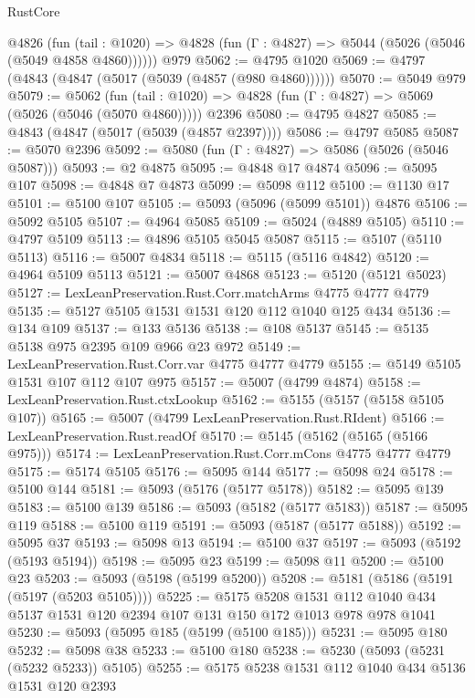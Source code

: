 \begin{lexlean}{RustCore}
\begin{coremodule}
    @4826
      (fun (tail : @1020) => @4828 (fun (Γ : @4827) => @5044 (@5026 (@5046 (@5049 @4858 @4860))))))
    @979
@5062 := @4795 @1020
@5069 := @4797 (@4843 (@4847 (@5017 (@5039 (@4857 (@980 @4860))))))
@5070 := @5049 @979
@5079 := @5062
    (fun (tail : @1020) => @4828 (fun (Γ : @4827) => @5069 (@5026 (@5046 (@5070 @4860)))))
    @2396
@5080 := @4795 @4827
@5085 := @4843 (@4847 (@5017 (@5039 (@4857 @2397))))
@5086 := @4797 @5085
@5087 := @5070 @2396
@5092 := @5080 (fun (Γ : @4827) => @5086 (@5026 (@5046 @5087)))
@5093 := @2 @4875
@5095 := @4848 @17 @4874
@5096 := @5095 @107
@5098 := @4848 @7 @4873
@5099 := @5098 @112
@5100 := @1130 @17
@5101 := @5100 @107
@5105 := @5093 (@5096 (@5099 @5101)) @4876
@5106 := @5092 @5105
@5107 := @4964 @5085
@5109 := @5024 (@4889 @5105)
@5110 := @4797 @5109
@5113 := @4896 @5105 @5045 @5087
@5115 := @5107 (@5110 @5113)
@5116 := @5007 @4834
@5118 := @5115 (@5116 @4842)
@5120 := @4964 @5109 @5113
@5121 := @5007 @4868
@5123 := @5120 (@5121 @5023)
@5127 := LexLeanPreservation.Rust.Corr.matchArms @4775 @4777 @4779
@5135 := @5127 @5105 @1531 @1531 @120 @112 @1040 @125 @434
@5136 := @134 @109
@5137 := @133 @5136
@5138 := @108 @5137
@5145 := @5135 @5138 @975 @2395 @109 @966 @23 @972
@5149 := LexLeanPreservation.Rust.Corr.var @4775 @4777 @4779
@5155 := @5149 @5105 @1531 @107 @112 @107 @975
@5157 := @5007 (@4799 @4874)
@5158 := LexLeanPreservation.Rust.ctxLookup
@5162 := @5155 (@5157 (@5158 @5105 @107))
@5165 := @5007 (@4799 LexLeanPreservation.Rust.RIdent)
@5166 := LexLeanPreservation.Rust.readOf
@5170 := @5145 (@5162 (@5165 (@5166 @975)))
@5174 := LexLeanPreservation.Rust.Corr.mCons @4775 @4777 @4779
@5175 := @5174 @5105
@5176 := @5095 @144
@5177 := @5098 @24
@5178 := @5100 @144
@5181 := @5093 (@5176 (@5177 @5178))
@5182 := @5095 @139
@5183 := @5100 @139
@5186 := @5093 (@5182 (@5177 @5183))
@5187 := @5095 @119
@5188 := @5100 @119
@5191 := @5093 (@5187 (@5177 @5188))
@5192 := @5095 @37
@5193 := @5098 @13
@5194 := @5100 @37
@5197 := @5093 (@5192 (@5193 @5194))
@5198 := @5095 @23
@5199 := @5098 @11
@5200 := @5100 @23
@5203 := @5093 (@5198 (@5199 @5200))
@5208 := @5181 (@5186 (@5191 (@5197 (@5203 @5105))))
@5225 := @5175
    @5208
    @1531
    @112
    @1040
    @434
    @5137
    @1531
    @120
    @2394
    @107
    @131
    @150
    @172
    @1013
    @978
    @978
    @1041
@5230 := @5093 (@5095 @185 (@5199 (@5100 @185)))
@5231 := @5095 @180
@5232 := @5098 @38
@5233 := @5100 @180
@5238 := @5230 (@5093 (@5231 (@5232 @5233)) @5105)
@5255 := @5175
    @5238
    @1531
    @112
    @1040
    @434
    @5136
    @1531
    @120
    @2393

\end{coremodule}
\end{lexlean}

